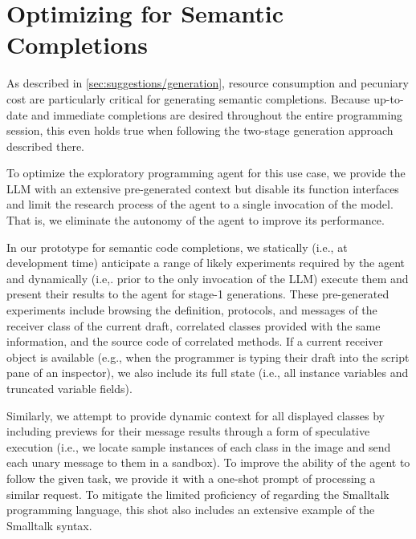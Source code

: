 
\section{Optimizing for Semantic Completions}
\label{sec:agent/completions}

As described in \cref{sec:suggestions/generation}, resource consumption and pecuniary cost are particularly critical for generating semantic completions.
Because up-to-date and immediate completions are desired throughout the entire programming session, this even holds true when following the two-stage generation approach described there.

To optimize the exploratory programming agent for this use case, we provide the LLM with an extensive pre-generated context but disable its function interfaces and limit the research process of the agent to a single invocation of the model.
That is, we eliminate the autonomy of the agent to improve its performance.

In our prototype for semantic code completions, we statically (i.e., at development time) anticipate a range of likely experiments required by the agent and dynamically (i.e,. prior to the only invocation of the LLM) execute them and present their results to the agent for stage-1 generations.
These pre-generated experiments include browsing the definition, protocols, and messages of the receiver class of the current draft, correlated classes provided with the same information, and the source code of correlated methods.
If a current receiver object is available (e.g., when the programmer is typing their draft into the script pane of an inspector), we also include its full state (i.e., all instance variables and truncated variable fields).

Similarly, we attempt to provide dynamic context for all displayed classes by including previews for their message results through a form of speculative execution (i.e., we locate sample instances of each class in the image and send each unary message to them in a sandbox).
To improve the ability of the agent to follow the given task, we provide it with a one-shot prompt of processing a similar request.
To mitigate the limited proficiency of \gptfouro regarding the Smalltalk programming language, this shot also includes an extensive example of the Smalltalk syntax.

